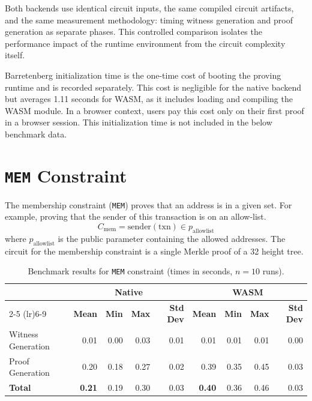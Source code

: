 \documentclass[9pt]{extreport}
\begin{document}
Both backends use identical circuit inputs, the same compiled circuit artifacts, and the same measurement methodology: timing witness generation  and proof generation as separate phases.  This controlled comparison isolates the performance impact of the runtime environment from the circuit complexity itself.

Barretenberg initialization time is the one-time cost of booting the proving runtime and is recorded separately. This cost is negligible for the native backend but averages 1.11 seconds for WASM, as it includes loading and compiling the WASM module. In a browser context, users pay this cost only on their first proof in a browser session.  This initialization time is not included in the below benchmark data.

\section{\texttt{MEM} Constraint}
\label{sec:mem-benchmark}
The membership constraint (\texttt{MEM}) proves that an address is in a given set. For example, proving that the sender of this transaction is on an allow-list.
$$C_{\text{mem}} = \text{sender}(\text{txn}) \in p_{\text{allowlist}}$$
where $p_{\text{allowlist}}$ is the public parameter containing the allowed addresses.  The circuit for the membership constraint is a single Merkle proof of a 32 height tree.  

\begin{table}[h]
\caption[MEM constraint benchmarks]{Benchmark results for \texttt{MEM} constraint (times in seconds, $n=10$ runs).}
\centering
\begin{tabular}{l rrrr rrrr}
 & \multicolumn{4}{c}{\textbf{Native}} & \multicolumn{4}{c}{\textbf{WASM}} \\
\cmidrule(lr){2-5} \cmidrule(lr){6-9}
 & \textbf{Mean} & \textbf{Min} & \textbf{Max} & \textbf{Std Dev}
 & \textbf{Mean} & \textbf{Min} & \textbf{Max} & \textbf{Std Dev} \\
\midrule
Witness Generation & 0.01 & 0.00 & 0.03 & 0.01 & 0.01 & 0.01 & 0.01 & 0.00 \\
Proof Generation   & 0.20 & 0.18 & 0.27 & 0.02 & 0.39 & 0.35 & 0.45 & 0.03 \\
\midrule
\textbf{Total}     & \textbf{0.21} & 0.19 & 0.30 & 0.03 & \textbf{0.40} & 0.36 & 0.46 & 0.03 \\
\end{tabular}
\label{tab:mem-benchmarks}
\end{table}
\end{document}

